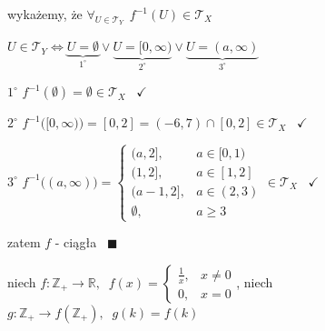 \documentclass[a4paper,12pt]{article}
\begin{document}
\begin{podpunkty}
    \smallskip
    \begin{minipage}[c]{0.5\linewidth}
    wykażemy, że \(\forall_{U \in \mathcal{T}_Y} \;\, f^{-1}(U) \in \mathcal{T}_X\)

    \smallskip
    \(U \in \mathcal{T}_Y \iff \underbrace{U = \emptyset}_{1^\circ} \lor \underbrace{U = [0, \infty)}_{2^\circ} \lor \underbrace{U = (a, \infty)}_{3^\circ}\)

    \smallskip
    \(1^\circ\) \; \(f^{-1}(\emptyset) = \emptyset \in \mathcal{T}_X\) \, \(\checkmark\)

    \(2^\circ\) \; \(f^{-1}\big([0, \infty)\big) = [0, 2] = (-6, 7) \cap [0, 2] \in \mathcal{T}_X\) \, \(\checkmark\)

    \(3^\circ\) \; \(f^{-1}\big((a, \infty)\big) = \begin{cases} (a, 2], & a \in [0, 1) \\ (1, 2], & a \in [1, 2] \\ (a - 1, 2], & a \in (2, 3) \\ \emptyset, & a \geq 3 \end{cases} \in \mathcal{T}_X\) \, \(\checkmark\)

    \smallskip
    zatem \(f\) - ciągła \, \(\blacksquare\)
    \end{minipage}
    \hspace{1.5em}
    \item niech \(f: \mathbb{Z}_+ \to \mathbb{R}, \;\; f(x) = \begin{cases} \frac{1}{x}, & x \neq 0 \\ 0, & x = 0 \end{cases}\), \; niech \(g: \mathbb{Z}_+ \to f(\mathbb{Z}_+), \;\; g(k) = f(k)\)


\end{podpunkty}
\end{document}
